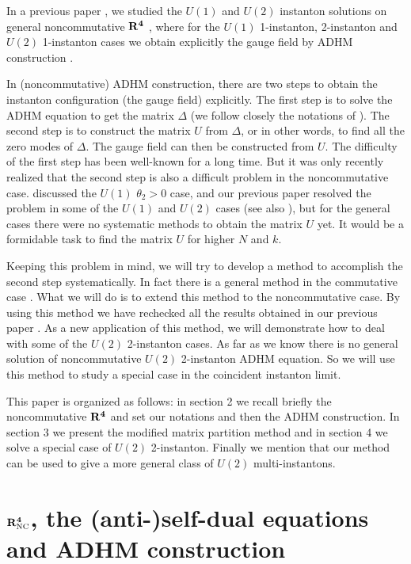 \documentclass[a4paper,a4paper]{article}
\begin{document}
In a previous paper \cite{TianZhu}, we studied the $U(1)$ and
$U(2)$ instanton solutions on general noncommutative $\bf{R}^4$
\cite{Schwarz}, where for the $U(1)$ 1-instanton, 2-instanton and
$U(2)$ 1-instanton cases we obtain explicitly the gauge field by
ADHM construction \cite{ADHM}.

In (noncommutative) ADHM construction, there are two steps to
obtain the instanton configuration (the gauge field) explicitly.
The first step is to solve the ADHM equation to get the matrix
$\Delta$ (we follow closely the notations of \cite{TianZhu}). The
second step is to construct the matrix $U$ from $\Delta$, or in
other words, to find all the zero modes of $\Delta$. The gauge
field can then be constructed from $U$. The difficulty of the
first step has been well-known for a long time. But it was only
recently realized that the second step is also a difficult problem
in the noncommutative case. \cite{Paperc} discussed the $U(1)$
$\theta_2>0$ case, and our previous paper \cite{TianZhu} resolved
the problem in some of the $U(1)$ and $U(2)$ cases (see also
\cite{Papera,Paperb,Paperd}), but for the general cases there were
no systematic methods to obtain the matrix $U$ yet. It would be a
formidable task to find the matrix $U$ for higher $N$ and $k$.

Keeping this problem in mind, we will try to develop a method to
accomplish the second step  systematically. In fact there is a
general method in the commutative case \cite{decomp}. What we will
do is to extend this method to the noncommutative case. By using
this method we have rechecked all the results obtained in our
previous paper \cite{TianZhu}. As a new application of this
method, we will demonstrate how to deal with some of the $U(2)$
2-instanton cases. As far as we know there is no general solution
of noncommutative $U(2)$ 2-instanton ADHM equation. So we will use
this method to study a special case in the coincident instanton
limit.

This paper is organized as follows: in section 2 we recall briefly
the noncommutative $\bf{R}^4$ and set our notations and then the
ADHM construction. In section 3 we present the modified matrix
partition method and in section 4 we solve a special case of
$U(2)$ 2-instanton. Finally we mention that our method can be used
to give a more general class of $U(2)$ multi-instantons.

\section{$\bf{R}_{\rm  NC}^4$,  the (anti-)self-dual equations and
ADHM construction}
\end{document}
